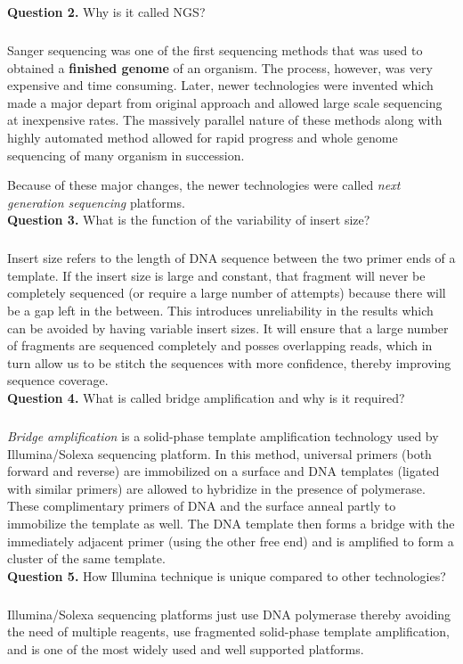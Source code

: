 \documentclass[12pt,a4paper]{report}
\begin{document}
\noindent
\textbf{Question 2.} Why is it called NGS?
\subparagraph{}
Sanger sequencing was one of the first sequencing methods that 
was used to obtained a \textbf{finished genome} of an organism. The process, 
however, was very expensive and time consuming. Later, newer technologies were
invented which made a major depart from original approach and allowed large 
scale sequencing at inexpensive rates. The massively parallel nature of these 
methods along with highly automated method allowed for rapid progress and whole 
genome sequencing of many organism in succession.

Because of these major changes, the newer technologies were called \textit{next 
generation sequencing} platforms.\mbox{}\\

\noindent
\textbf{Question 3.} What is the function of the variability of insert size?
\subparagraph{} Insert size refers to the length of DNA sequence between the 
two primer ends of a template. If the insert size is large and constant, that 
fragment will never be completely sequenced (or require a large number of 
attempts) because there will be a gap left in the between. This introduces 
unreliability in the results which can be avoided by having variable insert 
sizes. It will ensure that a large number of 
fragments are sequenced completely and posses overlapping reads, which in turn 
allow us to be stitch the sequences with more confidence, thereby improving 
sequence coverage.\mbox{}\\

\noindent
\textbf{Question 4.} What is called bridge amplification and why is it required?
\subparagraph{} \textit{Bridge amplification} is a solid-phase template 
amplification technology used by Illumina/Solexa sequencing platform. In this 
method, universal primers (both forward and reverse) are immobilized on a 
surface and DNA templates (ligated with similar primers) are allowed to 
hybridize in the presence of polymerase. These complimentary primers of DNA and 
the surface anneal partly to immobilize the template as well. The DNA template 
then forms a bridge with the immediately adjacent primer (using the other free 
end) and is amplified to form a cluster of the same template.\mbox{}\\

\noindent
\textbf{Question 5.} How Illumina technique is unique compared to other 
technologies?

\subparagraph{} Illumina/Solexa sequencing platforms just use DNA polymerase
thereby avoiding the need of multiple reagents, use fragmented solid-phase 
template amplification, and is one of the most widely used and well supported
platforms.\mbox{}\\
\end{document}
